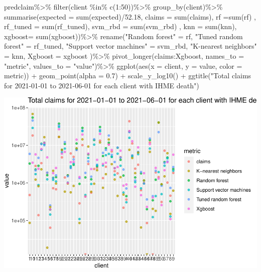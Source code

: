 \documentclass[
]{article}
\newenvironment{Shaded}{\begin{snugshade}}{\end{snugshade}}
\newcommand{\AttributeTok}[1]{\textcolor[rgb]{0.77,0.63,0.00}{#1}}
\newcommand{\DecValTok}[1]{\textcolor[rgb]{0.00,0.00,0.81}{#1}}
\newcommand{\FloatTok}[1]{\textcolor[rgb]{0.00,0.00,0.81}{#1}}
\newcommand{\FunctionTok}[1]{\textcolor[rgb]{0.00,0.00,0.00}{#1}}
\newcommand{\NormalTok}[1]{#1}
\newcommand{\OtherTok}[1]{\textcolor[rgb]{0.56,0.35,0.01}{#1}}
\newcommand{\SpecialCharTok}[1]{\textcolor[rgb]{0.00,0.00,0.00}{#1}}
\newcommand{\StringTok}[1]{\textcolor[rgb]{0.31,0.60,0.02}{#1}}
\begin{document}
\begin{Shaded}
\begin{Highlighting}[]
\NormalTok{predclaim}\SpecialCharTok{\%\textgreater{}\%}
  \FunctionTok{filter}\NormalTok{(client }\SpecialCharTok{\%in\%} \FunctionTok{c}\NormalTok{(}\DecValTok{1}\SpecialCharTok{:}\DecValTok{50}\NormalTok{))}\SpecialCharTok{\%\textgreater{}\%}
  \FunctionTok{group\_by}\NormalTok{(client)}\SpecialCharTok{\%\textgreater{}\%}
  \FunctionTok{summarise}\NormalTok{(}\AttributeTok{expected =} \FunctionTok{sum}\NormalTok{(expected)}\SpecialCharTok{/}\FloatTok{52.18}\NormalTok{,}
        \AttributeTok{claims =} \FunctionTok{sum}\NormalTok{(claims),}
          \AttributeTok{rf =}\FunctionTok{sum}\NormalTok{(rf) ,}
         \AttributeTok{rf\_tuned =} \FunctionTok{sum}\NormalTok{(rf\_tuned),}
         \AttributeTok{svm\_rbd =} \FunctionTok{sum}\NormalTok{(svm\_rbd) ,}
         \AttributeTok{knn =} \FunctionTok{sum}\NormalTok{(knn),}
         \AttributeTok{xgboost=} \FunctionTok{sum}\NormalTok{(xgboost))}\SpecialCharTok{\%\textgreater{}\%}
  \FunctionTok{rename}\NormalTok{(}\StringTok{"Random forest"} \OtherTok{=}\NormalTok{ rf, }\StringTok{"Tuned random forest"} \OtherTok{=}\NormalTok{ rf\_tuned, }
    \StringTok{"Support vector machines"} \OtherTok{=}\NormalTok{ svm\_rbd, }\StringTok{"K{-}nearest neighbors"} \OtherTok{=}\NormalTok{ knn, }\AttributeTok{Xgboost =}\NormalTok{ xgboost )}\SpecialCharTok{\%\textgreater{}\%}
  \FunctionTok{pivot\_longer}\NormalTok{(claims}\SpecialCharTok{:}\NormalTok{Xgboost, }\AttributeTok{names\_to =} \StringTok{"metric"}\NormalTok{, }\AttributeTok{values\_to =} \StringTok{"value"}\NormalTok{)}\SpecialCharTok{\%\textgreater{}\%}
  \FunctionTok{ggplot}\NormalTok{(}\FunctionTok{aes}\NormalTok{(}\AttributeTok{x =}\NormalTok{ client, }\AttributeTok{y =}\NormalTok{ value, }\AttributeTok{color =}\NormalTok{ metric)) }\SpecialCharTok{+} \FunctionTok{geom\_point}\NormalTok{(}\AttributeTok{alpha =} \FloatTok{0.7}\NormalTok{) }\SpecialCharTok{+}
  \FunctionTok{scale\_y\_log10}\NormalTok{() }\SpecialCharTok{+}
  \FunctionTok{ggtitle}\NormalTok{(}\StringTok{"Total claims for 2021{-}01{-}01 to 2021{-}06{-}01 for each client with IHME death"}\NormalTok{)}
\end{Highlighting}
\end{Shaded}

\includegraphics{figures/report/fig-unnamed-chunk-87-1.pdf}
\end{document}
